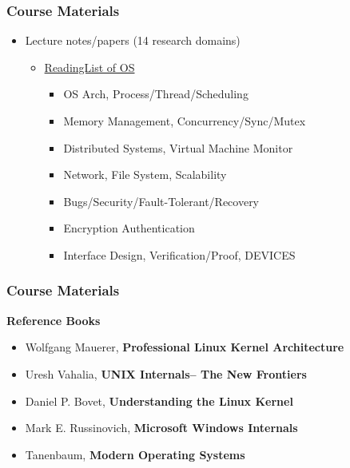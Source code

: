 \begin{frame}[plain]	
	\frametitle{Course Materials}
	
	\begin{itemize}\Large 
		\item Lecture notes/papers (14 research domains)
		
		\begin{itemize}\large 
			\item  \href{https://github.com/chyyuu/aos\_course/blob/master/readinglist.md}{ReadingList of OS}
			\begin{itemize}\large 
				\item OS Arch,  Process/Thread/Scheduling
				\item Memory Management, Concurrency/Sync/Mutex
				\item Distributed Systems, Virtual Machine Monitor
				\item Network, File System, Scalability
				\item Bugs/Security/Fault-Tolerant/Recovery
				\item Encryption Authentication
				\item Interface Design, Verification/Proof, DEVICES
			\end{itemize}
		\end{itemize}
	\end{itemize}
	
\end{frame}

\begin{frame}[plain]	
	\frametitle{Course Materials}
	\Large 
	\textbf{Reference Books}
	\begin{itemize}\large 
		\item Wolfgang Mauerer, \textbf{Professional Linux Kernel Architecture}
		\item Uresh Vahalia, \textbf{UNIX Internals-- The New Frontiers}
		\item Daniel P. Bovet, \textbf{Understanding the Linux Kernel}
		\item Mark E. Russinovich,\textbf{ Microsoft Windows Internals}
		\item Tanenbaum, \textbf{Modern Operating Systems}

	\end{itemize}
	
\end{frame}



